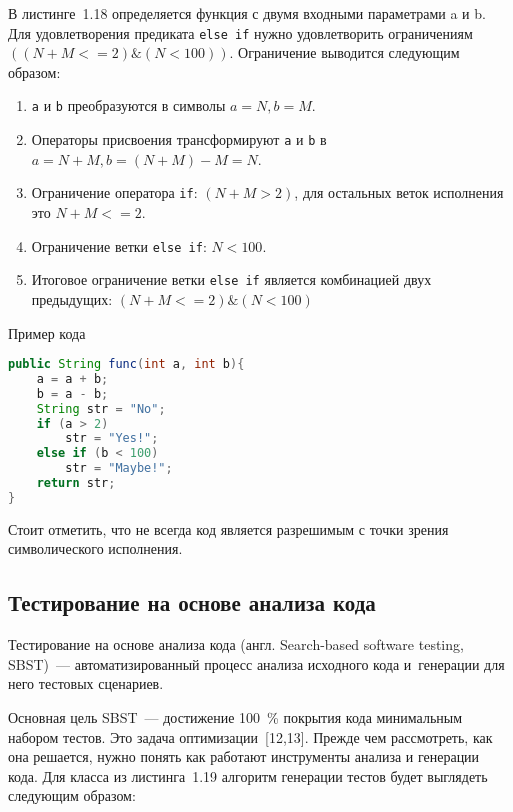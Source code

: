 В листинге~1.18 определяется функция с двумя входными параметрами a и b. Для удовлетворения предиката \texttt{else if} нужно удовлетворить ограничениям \(((N + M <= 2)\&(N < 100))\). Ограничение выводится следующим образом:

\begin{enumerate}
	\item \texttt{a} и \texttt{b} преобразуются в символы  \(a = N, b = M\).
	\item Операторы присвоения трансформируют \texttt{a} и \texttt{b} в  \(a = N + M, b = (N + M) - M = N\).
	\item Ограничение оператора \texttt{if}: \((N + M > 2)\), для остальных веток исполнения это \(N + M <= 2\).
	\item Ограничение ветки \texttt{else if}: \(N < 100\).
	\item Итоговое ограничение ветки \texttt{else if} является комбинацией  двух предыдущих:  \( (N + M <= 2) \& (N < 100)\)
\end{enumerate}

\begin{ListingEnv}[!h]%
	\captiondelim{ } %
	\caption{Пример кода}
	\begin{lstlisting}[language={Java}]
public String func(int a, int b){
	a = a + b;
	b = a - b;
	String str = "No";
	if (a > 2)
		str = "Yes!";
	else if (b < 100)
		str = "Maybe!";
	return str;
}
	\end{lstlisting}
\end{ListingEnv}%

Стоит отметить, что не всегда код является разрешимым с точки зрения символического исполнения.


\subsection{Тестирование на основе анализа кода} 
 
 Тестирование на основе анализа кода (англ. Search-based software testing,  SBST)~--- автоматизированный процесс анализа исходного кода и~генерации для него тестовых сценариев. 
 
 Основная цель SBST~--- достижение 100~\% покрытия кода минимальным набором тестов. Это задача оптимизации~[12,13]. Прежде чем рассмотреть, как она решается, нужно понять как работают инструменты  анализа и генерации кода. Для класса из листинга~1.19 алгоритм генерации тестов будет выглядеть следующим образом: 
 
